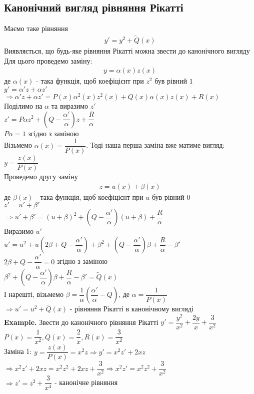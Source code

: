 \documentclass[a4paper, 14pt]{extarticle}
\def\bigline{\vspace{5mm}\\}
\begin{document}
\subsection{Канонічний вигляд рівняння Рікатті}
Маємо таке рівняння
\begin{align*}
y' = y^2 + \tilde{Q}(x)
\end{align*}
Виявляється, що будь-яке рівняння Рікатті можна звести до канонічного вигляду\\
Для цього проведемо заміну:
\begin{align*}
y = \alpha(x) z(x)
\end{align*}
де $\alpha(x)$ - така функція, щоб коефіцієнт при $z^2$ був рівний $1$\\
$y' = \alpha'z + \alpha z'$\\
$\Rightarrow \alpha'z + \alpha z' = P(x) \alpha^2(x) z^2(x) + Q(x) \alpha(x) z(x) + R(x)$\\
Поділимо на $\alpha$ та виразимо $z'$\\
$z' = P \alpha z^2 + \left(Q - \dfrac{\alpha'}{\alpha} \right)z + \dfrac{R}{\alpha}$\\
$P \alpha = 1$ згідно з заміною\\
Візьмемо $\alpha(x) = \dfrac{1}{P(x)}$. Тоді наша перша заміна вже матиме вигляд:\\
$y = \dfrac{z(x)}{P(x)}$\\
Проведемо другу заміну
\begin{align*}
z = u(x) + \beta(x)
\end{align*}
де $\beta(x)$ - така функція, щоб коефіцієнт при $u$ був рівний $0$\\
$z' = u' + \beta'$\\
$\Rightarrow u' + \beta' = (u+\beta)^2 + \left(Q - \dfrac{\alpha'}{\alpha} \right)(u+\beta) + \dfrac{R}{\alpha}$\\
Виразимо $u'$\\
$u' = u^2 + u \left( 2\beta + Q - \dfrac{\alpha'}{\alpha} \right) + \beta^2 + \left(Q - \dfrac{\alpha'}{\alpha} \right) \beta + \dfrac{R}{\alpha} - \beta'$\\
$2\beta + Q - \dfrac{\alpha'}{\alpha} = 0$ згідно з заміною\\
$\beta^2 + \left( Q - \dfrac{\alpha'}{\alpha} \right)\beta + \dfrac{R}{\alpha} - \beta' = \tilde{Q}(x)$\\
І нарешті, візьмемо $\beta = \dfrac{1}{\alpha} \left( \dfrac{\alpha'}{\alpha} - Q \right)$, де $\alpha = \dfrac{1}{P(x)}$\\
$\Rightarrow u' = u^2 + \tilde{Q}(x)$ - рівняння Рікатті в канонічному вигляді
\bigline
\textbf{Example.} Звести до канонічного рівняння Рікатті $y' = \dfrac{y^2}{x^2} + \dfrac{2y}{x} + \dfrac{3}{x^2}$\\
$P(x) = \dfrac{1}{x^2}, Q(x) = \dfrac{2}{x}, R(x) = \dfrac{3}{x^2}$\\
Заміна 1: $y = \dfrac{z(x)}{P(x)} = x^2 z \Rightarrow y' = x^2 z' + 2xz$\\
$\Rightarrow x^2 z' + 2xz = x^2 z^2 + 2xz + \dfrac{3}{x^2} \Rightarrow x^2z' = x^2z^2 + \dfrac{3}{x^2}$\\
$\Rightarrow z' = z^2 + \dfrac{3}{x^4}$ - канонічне рівняння
\bigline
\end{document}
